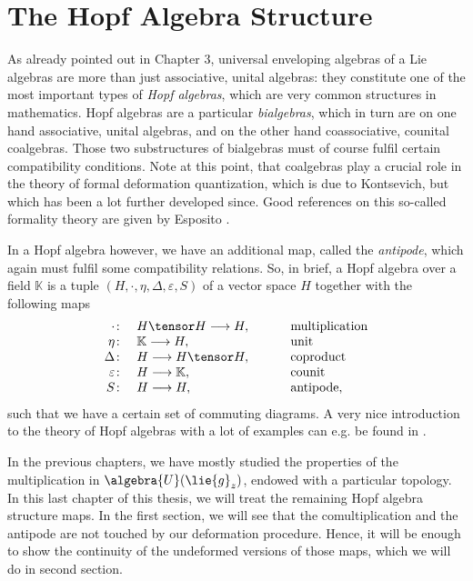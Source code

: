 
%
%

\chapter{The Hopf Algebra Structure}

As already pointed out in Chapter 3, universal enveloping algebras of a Lie 
algebras are more than just associative, unital algebras: they constitute one of 
the most important types of \emph{Hopf algebras}, which are very common 
structures in mathematics. Hopf algebras are a particular \emph{bialgebras}, 
which in turn are on one hand associative, unital algebras, and on the other hand 
coassociative, counital coalgebras. Those two substructures of bialgebras must of 
course fulfil certain compatibility conditions. Note at this point, that 
coalgebras play a crucial role in the theory of formal deformation quantization, 
which is due to Kontsevich, but which has been a lot further developed since. 
Good references on this so-called formality theory are given by Esposito 
\cite{esposito:2015a}.

In a Hopf algebra however, we have an 
additional map, called the \emph{antipode}, which again must fulfil some 
compatibility relations. So, in brief, a Hopf algebra over a field $\mathbb{K}$ 
is a tuple $(H, \cdot, \eta, \Delta, \varepsilon, S)$ of a vector space $H$ 
together with the following maps
\begin{equation*}
\begin{array}{rlrl}
	\cdot \colon
	&
	H \tensor H 
	\longrightarrow
	H, 
	& \quad &
	\text{ multiplication}
	\\
	\eta \colon
	&
	\mathbb{K}
	\longrightarrow
	H
	, 
	& \quad &
	\text{ unit}
	\\
	\Delta \colon
	&
	H
	\longrightarrow
	H \tensor H
	, & \quad &
	\text{ coproduct}
	\\
	\varepsilon \colon
	&
	H
	\longrightarrow
	\mathbb{K}
	, & \quad &
	\text{ counit}
	\\
	S \colon
	&
	H
	\longrightarrow
	H
	, & \quad &
	\text{ antipode},
\end{array}
\end{equation*}
such that we have a certain set of commuting diagrams. A very nice introduction 
to the theory of Hopf algebras with a lot of examples can e.g. be found in 
\cite{schweigert:2015a:script}.


In the previous chapters, we have mostly studied the properties of the 
multiplication in $\algebra{U}(\lie{g}_z)$, endowed with a particular topology. 
In this last chapter of this thesis, we will treat the remaining Hopf algebra 
structure maps. In the first section, we will see that the comultiplication and 
the antipode are not touched by our deformation procedure. Hence, it will be 
enough to show the continuity of the undeformed versions of those maps, which we 
will do in second section.



